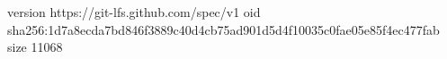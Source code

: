 version https://git-lfs.github.com/spec/v1
oid sha256:1d7a8ecda7bd846f3889c40d4cb75ad901d5d4f10035c0fae05e85f4ec477fab
size 11068
